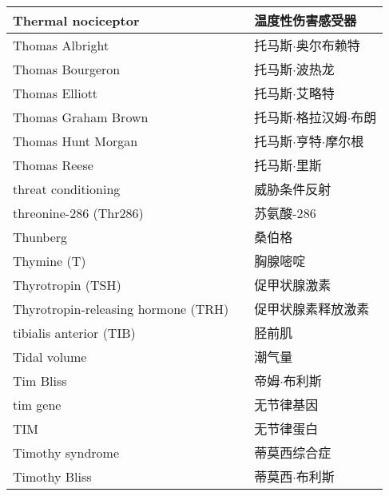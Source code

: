 \begin{longtable}{lll}
	\midrule
	Thermal nociceptor  && 温度性伤害感受器  \\
	
	\midrule
	Thomas Albright  && 托马斯$\cdot$奥尔布赖特  \\
	
	\midrule
	Thomas Bourgeron  && 托马斯$\cdot$波热龙  \\
	
	\midrule
	Thomas Elliott  && 托马斯$\cdot$艾略特  \\
	
	\midrule
	Thomas Graham Brown  && 托马斯$\cdot$格拉汉姆$\cdot$布朗  \\
	
	\midrule
	Thomas Hunt Morgan  && 托马斯$\cdot$亨特$\cdot$摩尔根  \\
	
	\midrule
	Thomas Reese  && 托马斯$\cdot$里斯  \\
	
	\midrule
	threat conditioning && 威胁条件反射  \\
	
	\midrule
	threonine-286 (Thr286) && 苏氨酸-286  \\
	
	\midrule
	Thunberg  && 桑伯格  \\
	
	\midrule
	Thymine (T)  && 胸腺嘧啶  \\
	
	\midrule
	Thyrotropin (TSH) && 促甲状腺激素  \\
	
	\midrule
	Thyrotropin-releasing hormone (TRH) && 促甲状腺素释放激素  \\
	
	\midrule
	tibialis anterior (TIB) && 胫前肌  \\
	
	\midrule
	Tidal volume  && 潮气量  \\
	
	\midrule
	Tim Bliss  && 帝姆$\cdot$布利斯  \\
	
	\midrule
	tim gene  && 无节律基因  \\
	
	\midrule
	TIM  && 无节律蛋白  \\
	
	\midrule
	Timothy syndrome  && 蒂莫西综合症  \\
	
	\midrule
	Timothy Bliss  && 蒂莫西$\cdot$布利斯  \\
	

\end{longtable}
